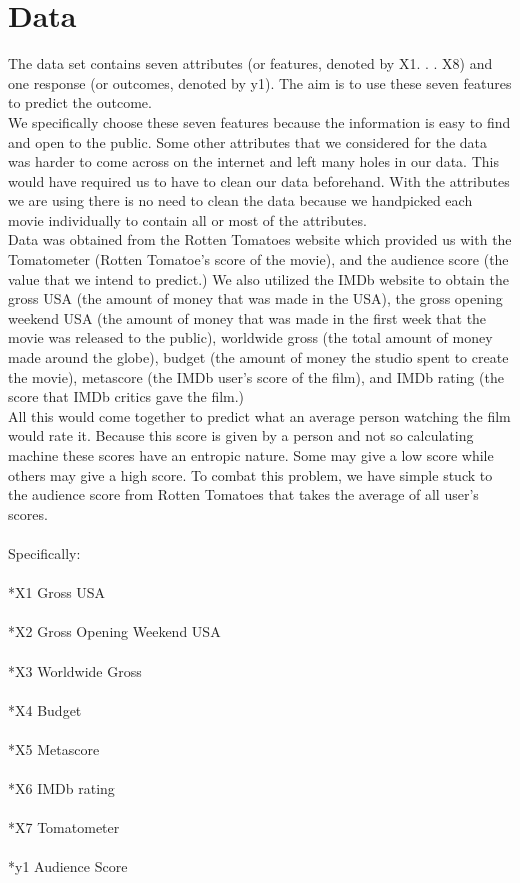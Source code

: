 \documentclass[10pt,twocolumn,letterpaper]{article}
\begin{document}
\section{Data}
	The data set contains seven attributes (or features, denoted by X1. . . X8) and
	one response (or outcomes, denoted by y1). The aim is to use these seven
	features to predict the outcome.\\
	We specifically choose these seven features because the information is easy to find
	and open to the public. Some other attributes that we considered for the data was
	harder to come across on the internet and left many holes in our data. This would have
	required us to have to clean our data beforehand. With the attributes we are using
	there is no need to clean the data because we handpicked each movie individually to
	contain all or most of the attributes.\\
	Data was obtained from the Rotten Tomatoes website which provided us with the
	Tomatometer (Rotten Tomatoe's score of the movie), and the audience score (the value
	that we intend to predict.) We also utilized the IMDb website to obtain the gross USA
	(the amount of money that was made in the USA), the gross opening weekend USA (the amount
	of money that was made in the first week that the movie was released to the public),
	worldwide gross (the total amount of money made around the globe), budget (the amount of
	money the studio spent to create the movie), metascore (the IMDb user's score of the
	film), and IMDb rating (the score that IMDb critics gave the film.)\\ All this would come together to predict what an average person watching the film would rate it. Because this score is given by a person and not so calculating machine these scores have an entropic nature. Some may give a low score while others may give a high score. To combat this problem, we have simple stuck to the audience score from Rotten Tomatoes that takes the average of all user's scores. 
	\\\\Specifically:\\
	\\*X1 Gross USA\\
	\\*X2 Gross Opening Weekend USA\\
	\\*X3 Worldwide Gross\\
	\\*X4 Budget\\
	\\*X5 Metascore\\
	\\*X6 IMDb rating\\
	\\*X7 Tomatometer\\
	\\*y1 Audience Score\\\\
	
\end{document}
